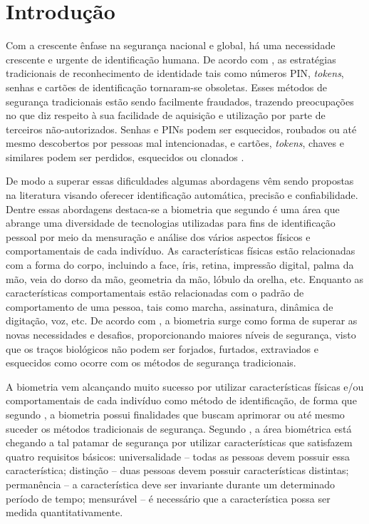 \chapter{Introdução}

Com a crescente ênfase na segurança nacional e global, há uma necessidade crescente e urgente de identificação humana. De acordo com , as estratégias tradicionais de reconhecimento de identidade  tais como números PIN, \textit{tokens}, senhas e cartões de identificação tornaram-se obsoletas. Esses métodos de segurança tradicionais estão sendo facilmente fraudados, trazendo preocupações no que diz respeito à sua facilidade de aquisição e utilização por parte de terceiros não-autorizados. Senhas e PINs podem ser esquecidos, roubados ou até mesmo descobertos por pessoas mal intencionadas, e cartões, \textit{tokens}, chaves e similares podem ser perdidos, esquecidos ou clonados \cite{lumini2017overview}. 


De modo a superar essas dificuldades algumas abordagens vêm sendo propostas na literatura visando oferecer identificação automática, precisão e confiabilidade. Dentre essas abordagens destaca-se a biometria que segundo  é uma área que abrange uma diversidade de tecnologias utilizadas para fins de identificação pessoal por meio da mensuração e análise dos vários aspectos físicos e comportamentais de cada indivíduo.  As características físicas estão relacionadas com a forma do corpo, incluindo a face, íris, retina, impressão digital, palma da mão, veia do dorso da mão, geometria da mão, lóbulo da orelha, etc. Enquanto as características comportamentais estão relacionadas com o padrão de comportamento de uma pessoa, tais como marcha, assinatura, dinâmica de digitação, voz, etc. De acordo  com , a biometria surge como forma de superar as novas necessidades e desafios, proporcionando maiores níveis de segurança, visto que os traços biológicos não podem ser forjados, furtados, extraviados e esquecidos como ocorre com os métodos de segurança tradicionais.


A biometria vem alcançando muito sucesso por utilizar características físicas e/ou comportamentais de cada indivíduo como método de identificação, de forma que segundo , a biometria possui finalidades que buscam aprimorar ou até mesmo suceder os métodos tradicionais de segurança. Segundo , a área biométrica está  chegando a tal patamar de segurança por utilizar características que satisfazem quatro requisitos básicos: universalidade – todas as pessoas devem possuir essa característica; distinção – duas pessoas devem possuir características distintas; permanência – a característica deve ser invariante durante um determinado período de tempo; mensurável – é necessário que a característica possa ser medida quantitativamente.




